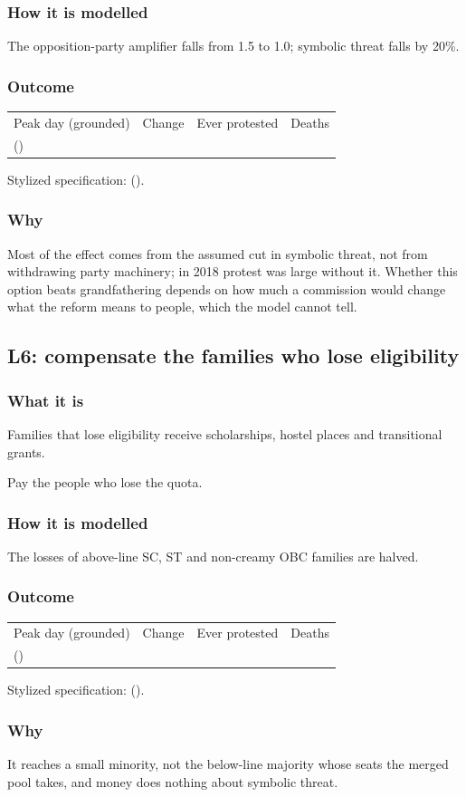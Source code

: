 \documentclass[11pt,a4paper]{article}
\makeatletter
\newcommand{\outcomeline}[6]{%
  \begin{tabular}{@{}llll@{}}
  \sffamily\small\color{muted}Peak day (grounded) & \sffamily\small\color{muted}Change & \sffamily\small\color{muted}Ever protested & \sffamily\small\color{muted}Deaths\\
  \textbf{#1} \small(#2) & \textbf{#3} & #4 & #5\\
  \end{tabular}\par\smallskip
  {\small\color{muted}Stylized specification: #6}\par}
\makeatother
\begin{document}
\subsubsection{How it is modelled}
The opposition-party amplifier falls from 1.5 to 1.0; symbolic threat falls by 20\%.
\subsubsection{Outcome}
\outcomeline{\PeakGroundedConsensusCommission}{\PeakRangeGroundedConsensusCommission}{\PeakChangeGroundedConsensusCommission}{\CumulativeGroundedConsensusCommission}{\DeathsGroundedConsensusCommission}{\PeakCentralConsensusCommission{} (\PeakChangeCentralConsensusCommission).}
\subsubsection{Why}
Most of the effect comes from the assumed cut in symbolic threat, not from withdrawing party machinery; in 2018 protest was large without it. Whether this option beats grandfathering depends on how much a commission would change what the reform means to people, which the model cannot tell.

\subsection{L6: compensate the families who lose eligibility}
\subsubsection{What it is}
Families that lose eligibility receive scholarships, hostel places and transitional grants.
\begin{plainwords}Pay the people who lose the quota.\end{plainwords}
\subsubsection{How it is modelled}
The losses of above-line SC, ST and non-creamy OBC families are halved.
\subsubsection{Outcome}
\outcomeline{\PeakGroundedCompensation}{\PeakRangeGroundedCompensation}{\PeakChangeGroundedCompensation}{\CumulativeGroundedCompensation}{\DeathsGroundedCompensation}{\PeakCentralCompensation{} (\PeakChangeCentralCompensation).}
\subsubsection{Why}
It reaches a small minority, not the below-line majority whose seats the merged pool takes, and money does nothing about symbolic threat.
\end{document}
